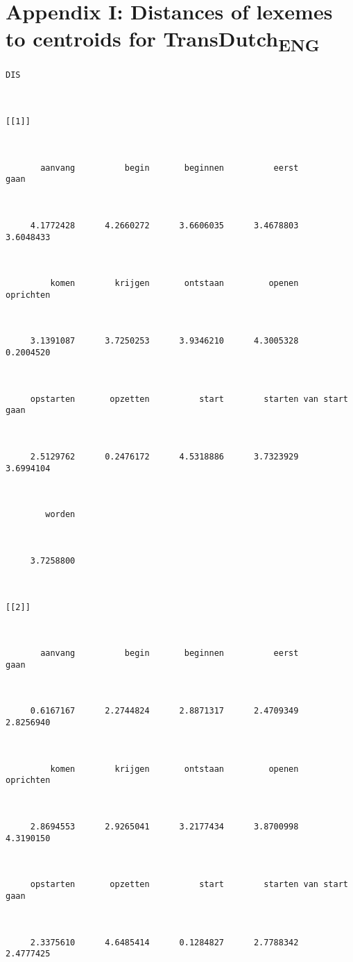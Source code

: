 \section*{Appendix I: Distances of lexemes to centroids for TransDutch\textsubscript{ENG}}
\begin{lstlisting}
DIS



[[1]]



       aanvang          begin       beginnen          eerst           gaan 



     4.1772428      4.2660272      3.6606035      3.4678803      3.6048433 



         komen        krijgen       ontstaan         openen      oprichten 



     3.1391087      3.7250253      3.9346210      4.3005328      0.2004520 



     opstarten       opzetten          start        starten van start gaan 



     2.5129762      0.2476172      4.5318886      3.7323929      3.6994104 



        worden 



     3.7258800 



[[2]]



       aanvang          begin       beginnen          eerst           gaan 



     0.6167167      2.2744824      2.8871317      2.4709349      2.8256940 



         komen        krijgen       ontstaan         openen      oprichten 



     2.8694553      2.9265041      3.2177434      3.8700998      4.3190150 



     opstarten       opzetten          start        starten van start gaan 



     2.3375610      4.6485414      0.1284827      2.7788342      2.4777425 




\end{lstlisting}
